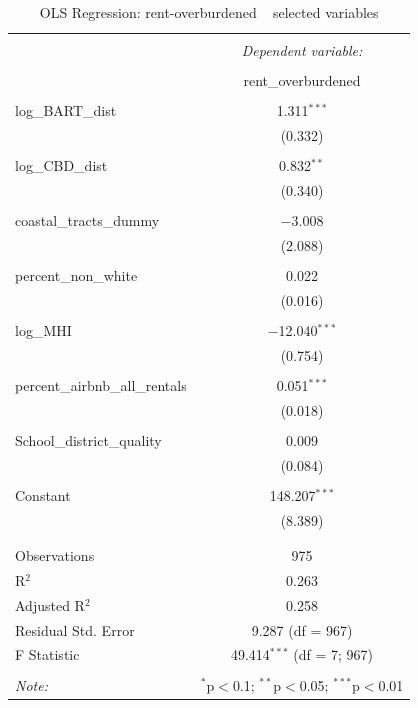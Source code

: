 \documentclass[10pt, letterpaper]{amsart}
\begin{document}



\begin{table}[!htbp] \centering 
  \caption{OLS Regression: rent-overburdened ~ selected variables} 
  \label{} 
  \begin{tabular}{@{\extracolsep{5pt}}lc} 
    \\[-1.8ex]\hline 
    \hline \\[-1.8ex] 
    & \multicolumn{1}{c}{\textit{Dependent variable:}} \\ 
    \cline{2-2} 
    \\[-1.8ex] & rent\_overburdened \\ 
    \hline \\[-1.8ex] 
    log\_BART\_dist & 1.311$^{***}$ \\ 
    & (0.332) \\ 
    & \\ 
    log\_CBD\_dist & 0.832$^{**}$ \\ 
    & (0.340) \\ 
    & \\ 
    coastal\_tracts\_dummy & $-$3.008 \\ 
    & (2.088) \\ 
    & \\ 
    percent\_non\_white & 0.022 \\ 
    & (0.016) \\ 
    & \\ 
    log\_MHI & $-$12.040$^{***}$ \\ 
    & (0.754) \\ 
    & \\ 
    percent\_airbnb\_all\_rentals & 0.051$^{***}$ \\ 
    & (0.018) \\ 
    & \\ 
    School\_district\_quality & 0.009 \\ 
    & (0.084) \\ 
    & \\ 
    Constant & 148.207$^{***}$ \\ 
    & (8.389) \\ 
    & \\ 
    \hline \\[-1.8ex] 
    Observations & 975 \\ 
    R$^{2}$ & 0.263 \\ 
    Adjusted R$^{2}$ & 0.258 \\ 
    Residual Std. Error & 9.287 (df = 967) \\ 
    F Statistic & 49.414$^{***}$ (df = 7; 967) \\ 
    \hline 
    \hline \\[-1.8ex] 
    \textit{Note:}  & \multicolumn{1}{r}{$^{*}$p$<$0.1; $^{**}$p$<$0.05; $^{***}$p$<$0.01} \\ 
  \end{tabular} 
\end{table}
\end{document}
